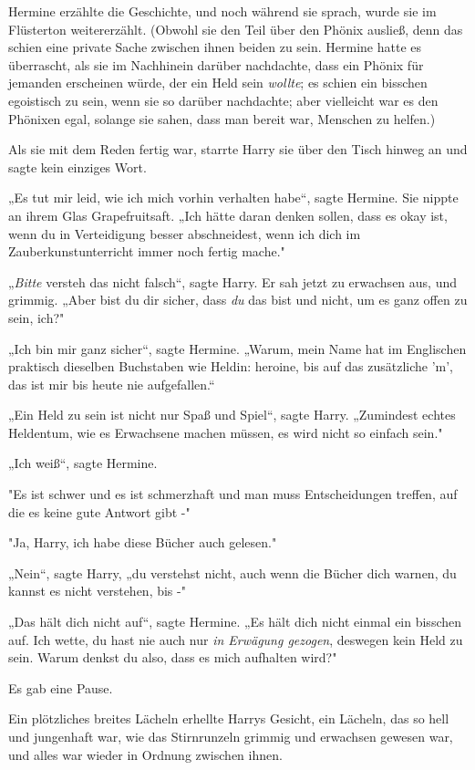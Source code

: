 {Hermine erzählte die Geschichte, und noch während sie sprach, wurde sie im Flüsterton weitererzählt. (Obwohl sie den Teil über den Phönix ausließ, denn das schien eine private Sache zwischen ihnen beiden zu sein. Hermine hatte es überrascht, als sie im Nachhinein darüber nachdachte, dass ein Phönix für jemanden erscheinen würde, der ein Held sein \emph{wollte}; es schien ein bisschen egoistisch zu sein, wenn sie so darüber nachdachte; aber vielleicht war es den Phönixen egal, solange sie sahen, dass man bereit war, Menschen zu helfen.)

Als sie mit dem Reden fertig war, starrte Harry sie über den Tisch hinweg an und sagte kein einziges Wort.

„Es tut mir leid, wie ich mich vorhin verhalten habe“, sagte Hermine. Sie nippte an ihrem Glas Grapefruitsaft. „Ich hätte daran denken sollen, dass es okay ist, wenn du in Verteidigung besser abschneidest, wenn ich dich im Zauberkunstunterricht immer noch fertig mache."

„\emph{Bitte} versteh das nicht falsch“, sagte Harry. Er sah jetzt zu erwachsen aus, und grimmig. „Aber bist du dir sicher, dass \emph{du} das bist und nicht, um es ganz offen zu sein, ich?"

„Ich bin mir ganz sicher“, sagte Hermine. „Warum, mein Name hat im Englischen praktisch dieselben Buchstaben wie Heldin: heroine, bis auf das zusätzliche 'm', das ist mir bis heute nie aufgefallen.“

„Ein Held zu sein ist nicht nur Spaß und Spiel“, sagte Harry. „Zumindest echtes Heldentum, wie es Erwachsene machen müssen, es wird nicht so einfach sein."

„Ich weiß“, sagte Hermine.

"Es ist schwer und es ist schmerzhaft und man muss Entscheidungen treffen, auf die es keine gute Antwort gibt -"

"Ja, Harry, ich habe diese Bücher auch gelesen."

„Nein“, sagte Harry, „du verstehst nicht, auch wenn die Bücher dich warnen, du kannst es nicht verstehen, bis -"

„Das hält dich nicht auf“, sagte Hermine. „Es hält dich nicht einmal ein bisschen auf. Ich wette, du hast nie auch nur \emph{in Erwägung gezogen}, deswegen kein Held zu sein. Warum denkst du also, dass es mich aufhalten wird?"

Es gab eine Pause.

Ein plötzliches breites Lächeln erhellte Harrys Gesicht, ein Lächeln, das so hell und jungenhaft war, wie das Stirnrunzeln grimmig und erwachsen gewesen war, und alles war wieder in Ordnung zwischen ihnen.

}
